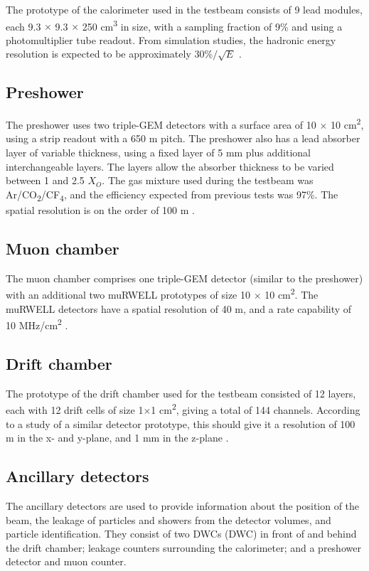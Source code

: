 The prototype of the calorimeter used in the testbeam consists of 9 lead modules, each 9.3 $\times$ 9.3 $\times$ 250 cm\textsuperscript{3} in size, with a sampling fraction of 9\% and using a photomultiplier tube readout. From simulation studies, the hadronic energy resolution is expected to be approximately 30\%$/\sqrt{E}$ \cite{idea-dual-readout} \cite{idea-rd52}.

\subsection{Preshower}
The preshower uses two triple-GEM detectors with a surface area of 10 $\times$ 10 cm\textsuperscript{2}, using a strip readout with a 650 \textmu m pitch. The preshower also has a lead absorber layer of variable thickness, using a fixed layer of 5 mm plus additional interchangeable layers. The layers allow the absorber thickness to be varied between 1 and 2.5 $X_O$. The gas mixture used during the testbeam was Ar/CO\textsubscript{2}/CF\textsubscript{4}, and the efficiency expected from previous tests was 97\%. The spatial resolution is on the order of 100 \textmu m \cite{idea-gem}.

\subsection{Muon chamber}
The muon chamber comprises one triple-GEM detector (similar to the preshower) with an additional two \acrshort{muRWELL} prototypes of size 10 $\times$ 10 cm\textsuperscript{2}. The \acrshort{muRWELL} detectors have a spatial resolution of 40 \textmu m, and a rate capability of 10 MHz/cm\textsuperscript{2} \cite{idea-micro-rwell}.

\subsection{Drift chamber}
The prototype of the drift chamber used for the testbeam consisted of 12 layers, each with 12 drift cells of size 1$\times$1 cm\textsuperscript{2}, giving a total of 144 channels. According to a study of a similar detector prototype, this should give it a resolution of 100 \textmu m in the x- and y-plane, and 1 mm in the z-plane \cite{idea-drift-chamber} .

\subsection{Ancillary detectors}
The ancillary detectors are used to provide information about the position of the beam, the leakage of particles and showers from the detector volumes, and particle identification. They consist of two \acrlong{DWC}s (\acrshort{DWC}) in front of and behind the drift chamber; leakage counters surrounding the calorimeter; and a preshower detector and muon counter.

